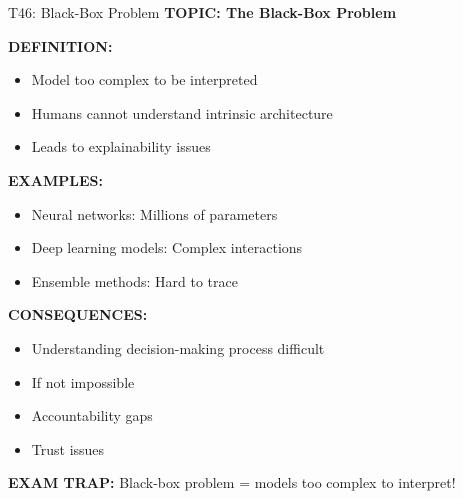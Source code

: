 \documentclass[8pt]{beamer}
\begin{document}
	\begin{frame}{T46: Black-Box Problem}
		\fontsize{6.5}{7.5}\selectfont
		\textbf{TOPIC: The Black-Box Problem}
		
		\vspace{0.1cm}
		\textbf{DEFINITION:}
		\begin{itemize}
			\item Model too complex to be interpreted
			\item Humans cannot understand intrinsic architecture
			\item Leads to explainability issues
		\end{itemize}
		
		\vspace{0.1cm}
		\textbf{EXAMPLES:}
		\begin{itemize}
			\item Neural networks: Millions of parameters
			\item Deep learning models: Complex interactions
			\item Ensemble methods: Hard to trace
		\end{itemize}
		
		\vspace{0.1cm}
		\textbf{CONSEQUENCES:}
		\begin{itemize}
			\item Understanding decision-making process difficult
			\item If not impossible
			\item Accountability gaps
			\item Trust issues
		\end{itemize}
		
		\textcolor{myred}{\textbf{EXAM TRAP:}} Black-box problem = \textcolor{myblue}{models too complex to interpret}!
	\end{frame}
	
\end{document}
